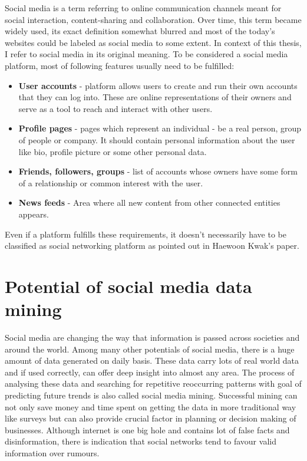 Social media is a term referring to online communication channels meant for social interaction, content-sharing and collaboration. Over time, this term became widely used, its exact definition somewhat blurred and most of the today's websites could be labeled as social media to some extent. In context of this thesis,  I refer to social media in its original meaning. To be considered a social media platform, most of following features usually need to be fulfilled:

\begin{itemize}
  \item \textbf{User accounts} - platform allows users to create and run their own accounts that they can log into. These are online representations of their owners and serve as a tool to reach and interact with other users.
  \item \textbf{Profile pages} - pages which represent an individual - be a real person, group of people or company. It should contain personal information about the user like bio, profile picture or some other personal data.
  \item \textbf{Friends, followers, groups} - list of accounts whose owners have some form of a relationship  or common interest with the user.
  \item \textbf{News feeds} - Area where all new content from other connected entities appears.
\end{itemize}

Even if a platform fulfills these requirements, it doesn't necessarily have to be classified as social networking platform as pointed out in Haewoon Kwak's paper\cite{kwak2010twitter}.

\section{Potential of social media data mining}
Social media are changing the way that information is passed across societies and around the world.\cite{mayfield2008social}
Among many other potentials of social media, there is a huge amount of data generated on daily basis. These data carry lots of real world data and if used correctly, can offer deep insight into almost any area. The process of analysing these data and searching for repetitive reoccurring patterns with goal of predicting future trends is also called social media mining. Successful mining can not only save money and time spent on getting the data in more traditional way like surveys but can also provide crucial factor in planning or decision making of businesses. Although internet is one big hole and contains lot of false facts and disinformation, there is indication that social networks tend to favour
valid information over rumours.\cite{castillo2011information} 

